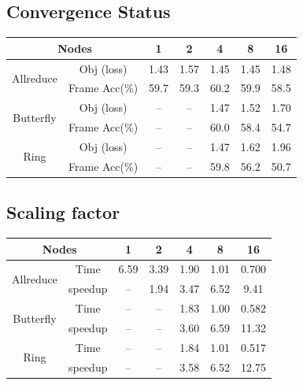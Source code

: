 \documentclass[landscape,final,archE1,fontscale=0.32]{baposter}
\begin{document}
\begin{poster}
{\subsection*{Convergence Status}
\begin{center}
  \begin{tabular}{c|c|c|c|c|c|c}
    \hline
           \multicolumn{2}{c|}{Nodes}         & 1    & 2    & 4    & 8    & 16 \\
    \hline
\multirow{2}{*}{Allreduce} &    Obj (loss)    & 1.43 & 1.57 & 1.45 & 1.45 & 1.48\\
                           &    Frame Acc(\%) & 59.7 & 59.3 & 60.2 & 59.9 & 58.5\\
    \hline
\multirow{2}{*}{Butterfly} &    Obj (loss)    & --   & --   & 1.47 & 1.52 & 1.70\\
                           &    Frame Acc(\%) & --   & --   & 60.0 & 58.4 & 54.7 \\
    \hline
\multirow{2}{*}{Ring}      &    Obj (loss)    & --   & --   & 1.47 & 1.62 & 1.96\\
                           &    Frame Acc(\%) & --   & --   & 59.8 & 56.2 & 50.7 \\
    \hline
  \end{tabular}
\end{center}


\subsection*{Scaling factor}
\begin{center}
  \begin{tabular}{c|c|c|c|c|c|c}
    \hline
           \multicolumn{2}{c|}{Nodes}   & 1    & 2    & 4    & 8    & 16 \\
    \hline
\multirow{2}{*}{Allreduce} &    Time    & 6.59 & 3.39 & 1.90 & 1.01 & 0.700\\
                           &    speedup & --   & 1.94 & 3.47 & 6.52 & 9.41 \\
    \hline
\multirow{2}{*}{Butterfly} &    Time    & --   & --   & 1.83 & 1.00 & 0.582\\
                           &    speedup & --   & --   & 3.60 & 6.59 & 11.32\\
    \hline
\multirow{2}{*}{Ring}      &    Time    & --   & --   & 1.84 & 1.01 & 0.517\\
                           &    speedup & --   & --   & 3.58 & 6.52 & 12.75\\
    \hline
  \end{tabular}
\end{center}

}
\end{poster}
\end{document}
